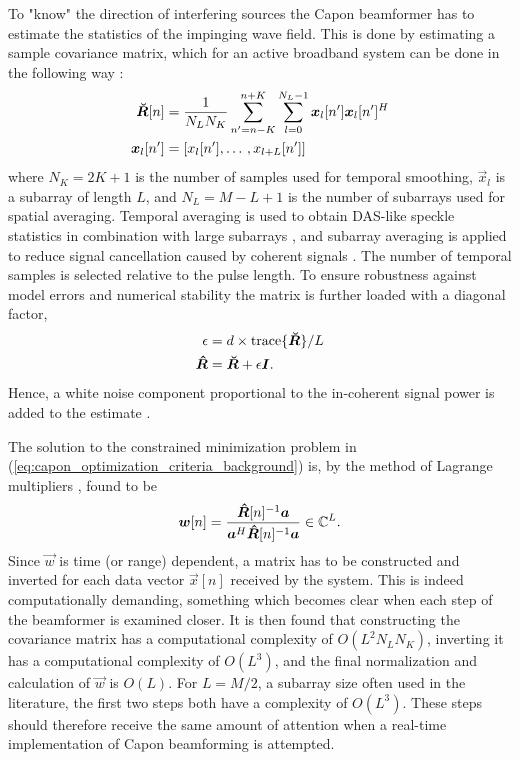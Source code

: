 To "know" the direction of interfering sources the Capon beamformer has to estimate the statistics of the impinging wave field. This is done by estimating a sample covariance matrix, which for an active broadband system can be done in the following way \cite{Synnevag2009}:
\begin{align}
\boldsymbol{\breve{R}}[n] &= \frac{1}{N_LN_K}\sum_{n'=n-K}^{n+K} \sum_{l=0}^{N_L-1} \boldsymbol{x}_l[n']\boldsymbol{x}_l[n']^H\\
\boldsymbol{x}_l[n'] &= [x_l[n'], \dotso, x_{l+L}[n']]
\end{align}
where $N_K = 2K + 1$  is the number of samples used for temporal smoothing, $\vec{x}_l$ is a subarray of length $L$, and $N_L = M-L+1$ is the number of subarrays used for spatial averaging.  Temporal averaging is used to obtain DAS-like speckle statistics in combination with large subarrays \cite{Synnevag2007a}, and subarray averaging is applied to reduce signal cancellation caused by coherent signals \cite{Reddy1987}. The number of temporal samples is selected relative to the pulse length. To ensure robustness against model errors and numerical stability the matrix is further loaded with a diagonal factor, 
\begin{align}
\epsilon &= d\times\text{trace}\{\boldsymbol{\breve{R}}\}/L\\
\boldsymbol{\hat{R}} &= \boldsymbol{\breve{R}} + \epsilon\boldsymbol{I}.
\end{align} 
Hence, a white noise component proportional to the in-coherent signal power is added to the estimate \cite{Featherstone1997b}.

The solution to the constrained minimization problem in (\ref{eq:capon_optimization_criteria_background}) is, by the method of Lagrange multipliers \cite{VanTrees2003}, found to be
\begin{align}\label{eq:capon_weights}
\boldsymbol{w}[n] = \frac{\boldsymbol{\hat{R}}[n]^{-1}\boldsymbol{a}}{\boldsymbol{a}^H\boldsymbol{\hat{R}}[n]^{-1}\boldsymbol{a}} \in \mathbb{C}^L.
\end{align}
Since $\vec{w}$ is time (or range) dependent, a matrix has to be constructed and inverted for each data vector $\vec{x}[n]$ received by the system. This is indeed computationally demanding, something which becomes clear when each step of the beamformer is examined closer. It is then found that constructing the covariance matrix has a computational complexity of $O(L^2N_LN_K)$, inverting it has a computational complexity of $O(L^3)$, and the final normalization and calculation of $\vec{w}$ is $O(L)$. For $L=M/2$, a subarray size often used in the literature, the first two steps both have a complexity of $O(L^3)$. These steps should therefore receive the same amount of attention when a real-time implementation of Capon beamforming is attempted.

